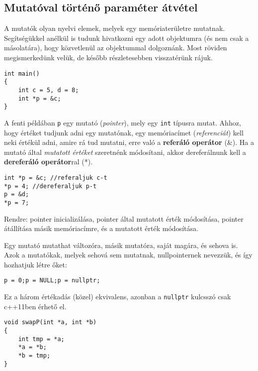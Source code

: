 \documentclass[a4paper,11.5pt]{article}
\begin{document}
	\subsection{Mutatóval történő paraméter átvétel}
	A mutatók olyan nyelvi elemek, melyek egy memóriaterületre mutatnak. Segítségükkel anélkül is tudunk hivatkozni egy adott objektumra (és nem csak a másolatára), hogy közvetlenül az objektummal dolgoznánk. Most röviden megismerkedünk velük, de később részletesebben visszatérünk rájuk.
	\begin{lstlisting}
int main()
{
	int c = 5, d = 8;
	int *p = &c;
}
	\end{lstlisting}
	A fenti példában \texttt{p} egy mutató (\textit{pointer}), mely egy \texttt{int} típusra mutat. Ahhoz, hogy értéket tudjunk adni egy mutatónak, egy memóriacímet (\textit{referenciát}) kell neki értékül adni, amire rá tud mutatni, erre való a \textbf{referáló operátor} (\&). Ha a mutató által \textit{mutatott értéket} szeretnénk módosítani, akkor dereferálnunk kell a \textbf{dereferáló operátor}ral (*).
	\begin{lstlisting}
int *p = &c; //referaljuk c-t
*p = 4; //dereferaljuk p-t
p = &d;
*p = 7;
	\end{lstlisting}
	Rendre: pointer inicializálása, pointer által mutatott érték módosítása, pointer átállítása másik memóriacímre, és a mutatott érték módosítása.
	
	Egy mutató mutathat változóra, másik mutatóra, saját magára, és sehova is. Azok a mutatókak, melyek sehová sem mutatnak, nullpointernek nevezzük, és így hozhatjuk létre őket:
	
	{\centering \texttt{p = 0;\quad \quad p = NULL;\quad \quad p = nullptr;} \par}
	
	\begin{note}
		Ez a három értékadás (közel) ekvivalens, azonban a \texttt{nullptr} kulcsszó csak c++11ben érhető el.
	\end{note}
	
	\begin{lstlisting}
void swapP(int *a, int *b)
{
	int tmp = *a;
	*a = *b;
	*b = tmp;
}
	\end{lstlisting}
	
\end{document}
